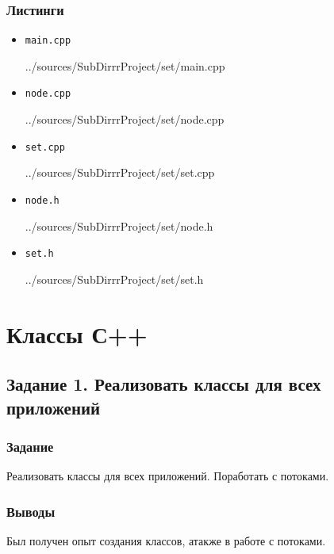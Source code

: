 \documentclass[12pt,a4paper]{report}
\begin{document}
\subsection*{Листинги}
\begin{itemize}
\item[] \verb-main.cpp-

{../sources/SubDirrrProject/set/main.cpp}
\item[] \verb-node.cpp-

{../sources/SubDirrrProject/set/node.cpp}
\item[] \verb-set.cpp-

{../sources/SubDirrrProject/set/set.cpp}
\item[] \verb-node.h-

{../sources/SubDirrrProject/set/node.h}
\item[] \verb-set.h-

{../sources/SubDirrrProject/set/set.h}
\end{itemize}

%

\chapter{Классы С++}
\section{Задание 1. Реализовать классы для всех приложений}
\subsection{Задание}
\hspace{\parindent}
Реализовать классы для всех приложений. Поработать с потоками.
\subsection{Выводы}
\hspace{\parindent}
Был получен опыт создания классов, атакже в работе с потоками.
\end{document}
